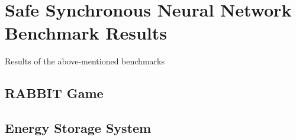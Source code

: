 \section{Safe Synchronous Neural Network Benchmark Results}
Results of the above-mentioned benchmarks

\subsection{RABBIT Game}

\subsection{Energy Storage System}